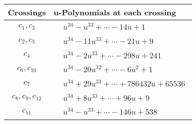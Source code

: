 \documentclass[1p]{elsarticle_modified}
\theoremstyle{definition}
\begin{document}
\begin{tabular}{m{50pt}|m{274pt}}
Crossings & \hspace{64pt}u-Polynomials at each crossing \\
\hline $$\begin{aligned}c_{1},c_{3}\end{aligned}$$&$\begin{aligned}
&u^{34}- u^{33}+\cdots-14 u+1
\end{aligned}$\\
\hline $$\begin{aligned}c_{2},c_{5}\end{aligned}$$&$\begin{aligned}
&u^{34}-11 u^{33}+\cdots-21 u+9
\end{aligned}$\\
\hline $$\begin{aligned}c_{4}\end{aligned}$$&$\begin{aligned}
&u^{34}-2 u^{33}+\cdots-298 u+241
\end{aligned}$\\
\hline $$\begin{aligned}c_{6},c_{10}\end{aligned}$$&$\begin{aligned}
&u^{34}-20 u^{32}+\cdots-6 u^2+1
\end{aligned}$\\
\hline $$\begin{aligned}c_{7}\end{aligned}$$&$\begin{aligned}
&u^{34}+29 u^{33}+\cdots+786432 u+65536
\end{aligned}$\\
\hline $$\begin{aligned}c_{8},c_{9},c_{12}\end{aligned}$$&$\begin{aligned}
&u^{34}+8 u^{33}+\cdots+96 u+9
\end{aligned}$\\
\hline $$\begin{aligned}c_{11}\end{aligned}$$&$\begin{aligned}
&u^{34}- u^{33}+\cdots-146 u+538
\end{aligned}$\\
\hline
\end{tabular}\\~\\
\newpage\renewcommand{\arraystretch}{1}
\end{document}
